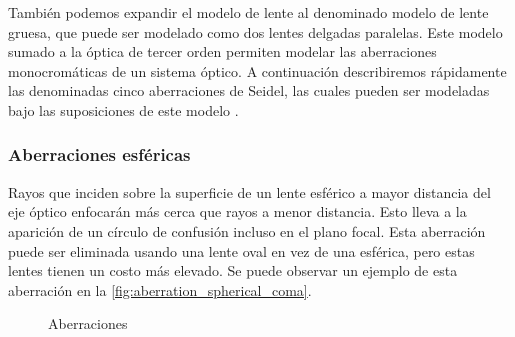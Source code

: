 También podemos expandir el modelo de lente al denominado modelo de lente gruesa, que puede ser modelado como dos lentes delgadas paralelas. Este modelo sumado a la óptica de tercer orden permiten modelar las aberraciones monocromáticas de un sistema óptico. A continuación describiremos rápidamente las denominadas cinco aberraciones de Seidel, las cuales pueden ser modeladas bajo las suposiciones de este modelo \cite{hanning2011high}.

\subsubsection{Aberraciones esféricas}
Rayos que inciden sobre la superficie de un lente esférico a mayor distancia del eje óptico enfocarán más cerca que rayos a menor distancia. Esto lleva a la aparición de un círculo de confusión incluso en el plano focal. Esta aberración puede ser eliminada usando una lente oval en vez de una esférica, pero estas lentes tienen un costo más elevado. Se puede observar un ejemplo de esta aberración en la \autoref{fig:aberration_spherical_coma}.

\begin{figure}[bth]
    \myfloatalign
        \myfloatalign
        \caption{Aberraciones}\label{fig:aberration_spherical_coma}
\end{figure}

